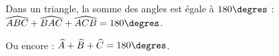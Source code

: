 Dans un triangle, la somme des angles est égale à $180\degres$ :
$\widehat{ABC} + \widehat{BAC} + \widehat{ACB}= 180\degres$.\par
Ou encore : $\widehat A + \widehat B + \widehat C = 180\degres$.